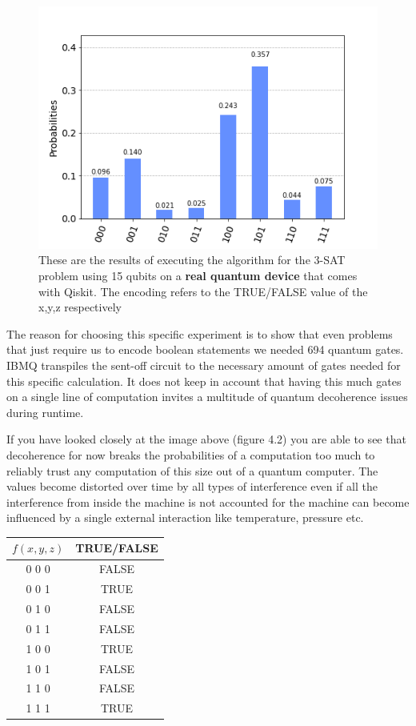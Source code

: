 \begin{figure}[h]
	\centering
	\includegraphics[scale = 0.75]{../Demonstration/img/real_device_3SAT.PNG}
	\caption{These are the results of executing the algorithm for the 3-SAT problem using 15 qubits on a \textbf{real quantum device} that comes with Qiskit. The encoding refers to the TRUE/FALSE value of the x,y,z respectively}
\end{figure}

The reason for choosing this specific experiment is to show that even problems that just require us to encode boolean statements we needed 694 quantum gates. IBMQ transpiles the sent-off circuit to the necessary amount of gates needed for this specific calculation. It does not keep in account that having this much gates on a single line of computation invites a multitude of quantum decoherence issues during runtime. 

If you have looked closely at the image above (figure 4.2) you are able to see that decoherence for now breaks the probabilities of a computation too much to reliably trust any computation of this size out of a quantum computer. The values become distorted over time by all types of interference even if all the interference from inside the machine is not accounted for the machine can become influenced by a single external interaction like temperature, pressure etc. 

\begin{center}
	\begin{tabular}{|| c c ||}
		\hline
		$f(x,y,z)$ & TRUE/FALSE \\
		\hline\hline
		0 0 0 & FALSE \\ 
		0 0 1 & TRUE \\
		0 1 0 & FALSE \\
		0 1 1 & FALSE \\
		1 0 0 & TRUE \\
		1 0 1 & FALSE \\
		1 1 0 & FALSE \\
		1 1 1 & TRUE \\
		\hline
	\end{tabular}
\end{center}

